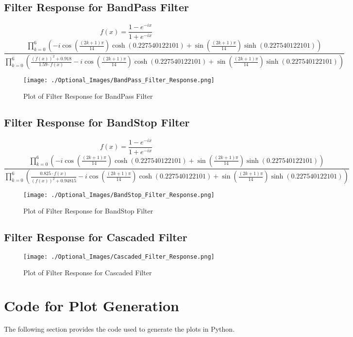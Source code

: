 \documentclass{article}
\begin{document}
\subsection{Filter Response for BandPass Filter}
\[
    f(x) = \frac{1 - e^{-ix}}{1 + e^{-ix}}
\]
\[
\frac{\prod_{k=0}^{6} \left( -i \cos\left(\frac{(2k+1) \pi}{14}\right) \cosh(0.227540122101) + \sin\left(\frac{(2k+1) \pi}{14}\right) \sinh(0.227540122101) \right)}
{\prod_{k=0}^{6} \left( \frac{\left(f(x)\right)^2 + 0.918}{1.59 \cdot f(x)} - i \cos\left(\frac{(2k+1) \pi}{14}\right) \cosh(0.227540122101) + \sin\left(\frac{(2k+1) \pi}{14}\right) \sinh(0.227540122101) \right)}
\]
\begin{figure}[h!]
    \centering
    \texttt{[image: ./Optional\_Images/BandPass\_Filter\_Response.png]}
    \caption{Plot of Filter Response for BandPass Filter}
    \label{fig:enter-label}
\end{figure}

\newpage
\subsection{Filter Response for BandStop Filter}
\[
    f(x) = \frac{1 - e^{-ix}}{1 + e^{-ix}}
\]
\[
\frac{\prod_{k=0}^{6} \left( -i \cos\left(\frac{(2k+1) \pi}{14}\right) \cosh(0.227540122101) + \sin\left(\frac{(2k+1) \pi}{14}\right) \sinh(0.227540122101) \right)}
{\prod_{k=0}^{6} \left( \frac{0.825 \cdot f(x)}{\left(f(x)\right)^2 + 0.94815} - i \cos\left(\frac{(2k+1) \pi}{14}\right) \cosh(0.227540122101) + \sin\left(\frac{(2k+1) \pi}{14}\right) \sinh(0.227540122101) \right)}
\]
\begin{figure}[h!]
    \centering
    \texttt{[image: ./Optional\_Images/BandStop\_Filter\_Response.png]}
    \caption{Plot of Filter Response for BandStop Filter}
    \label{fig:enter-label}
\end{figure}

\subsection{Filter Response for Cascaded Filter}
\begin{figure}[h!]
    \centering
    \texttt{[image: ./Optional\_Images/Cascaded\_Filter\_Response.png]}
    \caption{Plot of Filter Response for Cascaded Filter}
    \label{fig:enter-label}
\end{figure}


\newpage 
\section{Code for Plot Generation}
The following section provides the code used to generate the plots in Python.
\end{document}
